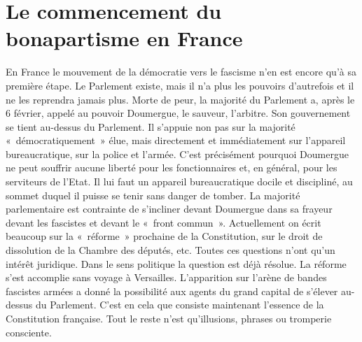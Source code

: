 \documentclass[french,twoside]{book} %
\begin{document}
\section[{Le commencement du bonapartisme en France}]{Le commencement du bonapartisme en France}
\noindent En France le mouvement de la démocratie vers le fascisme n’en est encore qu’à sa première étape. Le Parlement existe, mais il n’a plus les pouvoirs d’autrefois et il  ne les reprendra jamais plus. Morte de peur, la majorité du Parlement a, après le 6 février, appelé au pouvoir Doumergue, le sauveur, l’arbitre. Son gouvernement se tient au-dessus du Parlement. Il s’appuie non pas sur la majorité « démocratiquement » élue, mais directement et immédiatement sur l’appareil bureaucratique, sur la police et l’armée. C’est précisément pourquoi Doumergue ne peut souffrir aucune liberté pour les fonctionnaires et, en général, pour les serviteurs de l’Etat. Il lui faut un appareil bureaucratique docile et discipliné, au sommet duquel il puisse se tenir sans danger de tomber. La majorité parlementaire est contrainte de s’incliner devant Doumergue dans sa frayeur devant les fascistes et devant le « front commun ». Actuellement on écrit beaucoup sur la « réforme » prochaine de la Constitution, sur le droit de dissolution de la Chambre des députés, etc. Toutes ces questions n’ont qu’un intérêt juridique. Dans le sens politique la question est déjà résolue. La réforme s’est accomplie sans voyage à Versailles. L’apparition sur l’arène de bandes fascistes armées a donné la possibilité aux agents du grand capital de s’élever au-dessus du Parlement. C’est en cela que consiste maintenant l’essence de la Constitution française. Tout le reste n’est qu’illusions, phrases ou tromperie consciente.\par
\end{document}
